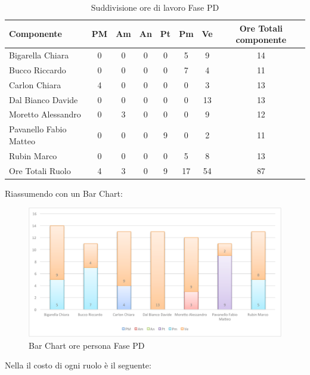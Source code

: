 				\begin{table}[H]
					\begin{center}
						\begin{tabular}{| l | c | c | c | c | c | c | c |}
							\hline
							Componente 					& PM	& Am 	& An 	& Pt 		& Pm 	& Ve 		& Ore Totali componente \\ \hline
							
							Bigarella Chiara 			& 0		& 0		& 0		& 0		& 5 		& 9 		& 14 \\
							Bucco Riccardo 				& 0		& 0		& 0		& 0		& 7			& 4 		& 11 \\
							Carlon Chiara	 			& 4 	& 0		& 0		& 0		& 0			& 3 		& 13 \\
							Dal Bianco Davide 			& 0		& 0		& 0		& 0		& 0			& 13 		& 13 \\
							Moretto Alessandro 			& 0		& 3 	& 0		& 0		& 0			& 9 		& 12 \\
							Pavanello Fabio Matteo	 	& 0		& 0		& 0		& 9 	& 0			& 2 		& 11 \\
							Rubin Marco					& 0		& 0		& 0		& 0		& 5 		& 8 		& 13 \\ \hline \hline
							
							Ore Totali Ruolo 			& 4 	& 3 	& 0		& 9 	& 17 		& 54 		& 87\\ \hline
						\end{tabular}
					\end{center}
					\caption{Suddivisione ore di lavoro Fase PD}
				\end{table}
				Riassumendo con un Bar Chart:
				\begin{figure}[H]\centering
					\includegraphics[width=\textwidth]{PianoDiProgetto/Pics/ChartOreFasePD.pdf}
					\caption{Bar Chart ore persona Fase PD}
				\end{figure}
				Nella  il costo di ogni ruolo è il seguente:
